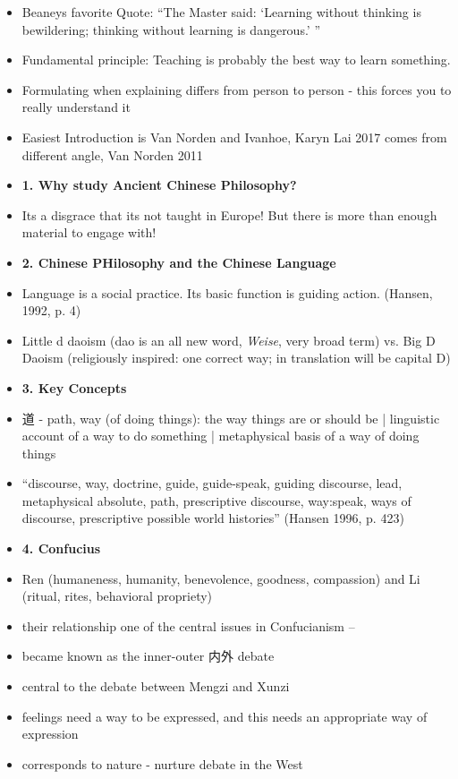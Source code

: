 \documentclass[emulatestandardclasses]{scrartcl}
\begin{document}
\begin{itemize}
  \item Beaneys favorite Quote: "`The Master said: `Learning without thinking is bewildering; thinking without learning is dangerous.' "'
  \item Fundamental principle: Teaching is probably the best way to learn something.
  \item Formulating when explaining differs from person to person - this forces you to really understand it
  \item Easiest Introduction is Van Norden and Ivanhoe, Karyn Lai 2017 comes from different angle, Van Norden 2011
  \item \textbf{1. Why study Ancient Chinese Philosophy?}
  \item Its a disgrace that its not taught in Europe! But there is more than enough material to engage with! 
  \item \textbf{2. Chinese PHilosophy and the Chinese Language}
  \item Language is a social practice. Its basic function is guiding action. (Hansen, 1992, p. 4)
  \item Little d daoism (dao is an all new word, \emph{Weise}, very broad term) vs. Big D Daoism (religiously inspired: one correct way; in translation will be capital D)
  \item \textbf{3. Key Concepts}
  \item 道 - path, way (of doing things): the way things are or should be | linguistic account of a way to do something | metaphysical basis of a way of doing things
  \item "`discourse, way, doctrine, guide, guide-speak, guiding discourse, lead, metaphysical absolute, path, prescriptive discourse, way:speak, ways of discourse, prescriptive possible world histories"' (Hansen 1996, p. 423)
  \item \textbf{4. Confucius}
  \item Ren (humaneness, humanity, benevolence, goodness, compassion) and Li (ritual, rites, behavioral propriety)
  \item their relationship one of the central issues in Confucianism – 
  \item became known as the inner-outer 内外 debate
  \item central to the debate between Mengzi and Xunzi
  \item feelings need a way to be expressed, and this needs an appropriate way of expression
  \item corresponds to nature - nurture debate in the West

\end{itemize}
\end{document}
